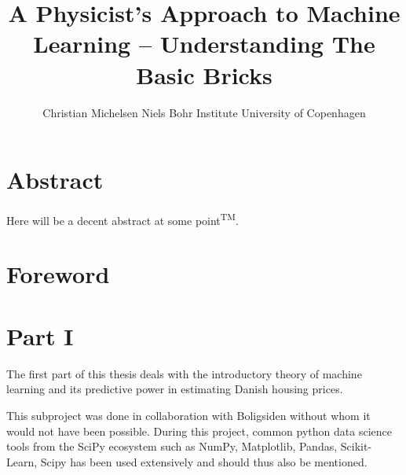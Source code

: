 \documentclass[a4paper, twoside, nobib]{tufte-book}
\title[A Physicist's Approach To Machine Learning -- Understanding The Basic Bricks]{A Physicist's \newline \noindent 
       Approach to \newline \noindent 
       Machine Learning \newline \noindent
       --  \newline \noindent
       Understanding  \newline \noindent
       The Basic Bricks}
\author[Christian Michelsen]{\newline \noindent 
        Christian Michelsen \newline \noindent 
        Niels Bohr Institute \newline \noindent 
        University of Copenhagen \newline }
\newcommand{\autocite}[1]{\citep{#1}}
\begin{document}
\maketitle



\chapter*{Abstract}
Here will be a decent abstract at some point\textsuperscript{TM}.


\cleardoublepage
{}
{}

\tableofcontents

\cleardoublepage



\chapter*{Foreword}



\mainmatter




\chapter*{Part I}
The first part of this thesis deals with the introductory theory of machine learning and its predictive power in estimating Danish housing prices.  

This subproject was done in collaboration with Boligsiden without whom it would not have been possible. During this project, common python data science tools from the SciPy ecosystem\autocite{virtanenSciPyFundamentalAlgorithms2019} such as NumPy, Matplotlib, Pandas, Scikit-Learn, Scipy has been used extensively and should thus also be mentioned. 
\end{document}

